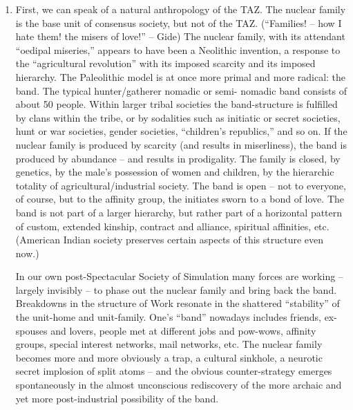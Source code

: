 \documentclass[a4paper,english,10pt,twoside]{article}
\begin{document}
\begin{enumerate}
    \item{First, we can speak of a natural anthropology of the TAZ. The nuclear family is the base unit of consensus society, but not of the TAZ. (\enquote{Families! -- how I hate them! the misers of love!} -- Gide) The nuclear family, with its attendant \enquote{oedipal miseries,} appears to have been a Neolithic invention, a response to the \enquote{agricultural revolution} with its imposed scarcity and its imposed hierarchy. The Paleolithic model is at once more primal and more radical: the band. The typical hunter/gatherer nomadic or semi- nomadic band consists of about 50 people. Within larger tribal societies the band-structure is fulfilled by clans within the tribe, or by sodalities such as initiatic or secret societies, hunt or war societies, gender societies, \enquote{children's republics,} and so on. If the nuclear family is produced by scarcity (and results in miserliness), the band is produced by abundance -- and results in prodigality. The family is closed, by genetics, by the male's possession of women and children, by the hierarchic totality of agricultural/industrial society. The band is open -- not to everyone, of course, but to the affinity group, the initiates sworn to a bond of love. The band is not part of a larger hierarchy, but rather part of a horizontal pattern of custom, extended kinship, contract and alliance, spiritual affinities, etc. (American Indian society preserves certain aspects of this structure even now.)

\medskip
In our own post-Spectacular Society of Simulation many forces are working -- largely invisibly -- to phase out the nuclear family and bring back the band. Breakdowns in the structure of Work resonate in the shattered \enquote{stability} of the unit-home and unit-family. One's \enquote{band} nowadays includes friends, ex-spouses and lovers, people met at different jobs and pow-wows, affinity groups, special interest networks, mail networks, etc. The nuclear family becomes more and more obviously a trap, a cultural sinkhole, a neurotic secret implosion of split atoms -- and the obvious counter-strategy emerges spontaneously in the almost unconscious rediscovery of the more archaic and yet more post-industrial possibility of the band.}


\end{enumerate}
\end{document}
